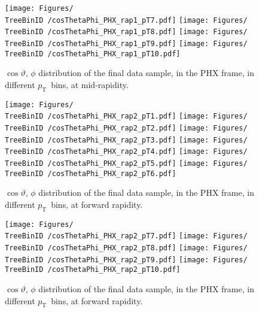 \documentclass[12pt]{article}
\newcommand{\pt}{$p_{\mathrm{T}}$}
\providecommand{\TreeBinID}[1]{TreeBinIDDefault_rap1pt1}%
\begin{document}
\begin{figure}[htbp]
\centering
\texttt{[image: Figures/\\TreeBinID /cosThetaPhi\_PHX\_rap1\_pT7.pdf]}
\texttt{[image: Figures/\\TreeBinID /cosThetaPhi\_PHX\_rap1\_pT8.pdf]}
\texttt{[image: Figures/\\TreeBinID /cosThetaPhi\_PHX\_rap1\_pT9.pdf]}
\texttt{[image: Figures/\\TreeBinID /cosThetaPhi\_PHX\_rap1\_pT10.pdf]}
\caption{$\cos\vartheta,\,\phi$ distribution of the final data sample, in the PHX
frame, in different \pt\ bins, at mid-rapidity.}
\end{figure}
\clearpage

\begin{figure}[htbp]
\centering
\texttt{[image: Figures/\\TreeBinID /cosThetaPhi\_PHX\_rap2\_pT1.pdf]}
\texttt{[image: Figures/\\TreeBinID /cosThetaPhi\_PHX\_rap2\_pT2.pdf]}
\texttt{[image: Figures/\\TreeBinID /cosThetaPhi\_PHX\_rap2\_pT3.pdf]}
\texttt{[image: Figures/\\TreeBinID /cosThetaPhi\_PHX\_rap2\_pT4.pdf]}
\texttt{[image: Figures/\\TreeBinID /cosThetaPhi\_PHX\_rap2\_pT5.pdf]}
\texttt{[image: Figures/\\TreeBinID /cosThetaPhi\_PHX\_rap2\_pT6.pdf]}
\caption{$\cos\vartheta,\,\phi$ distribution of the final data sample, in the PHX
frame, in different \pt\ bins, at forward rapidity.}
\end{figure}
\clearpage

\begin{figure}[htbp]
\centering
\texttt{[image: Figures/\\TreeBinID /cosThetaPhi\_PHX\_rap2\_pT7.pdf]}
\texttt{[image: Figures/\\TreeBinID /cosThetaPhi\_PHX\_rap2\_pT8.pdf]}
\texttt{[image: Figures/\\TreeBinID /cosThetaPhi\_PHX\_rap2\_pT9.pdf]}
\texttt{[image: Figures/\\TreeBinID /cosThetaPhi\_PHX\_rap2\_pT10.pdf]}
\caption{$\cos\vartheta,\,\phi$ distribution of the final data sample, in the PHX
frame, in different \pt\ bins, at forward rapidity.}
\end{figure}
\clearpage
\end{document}
